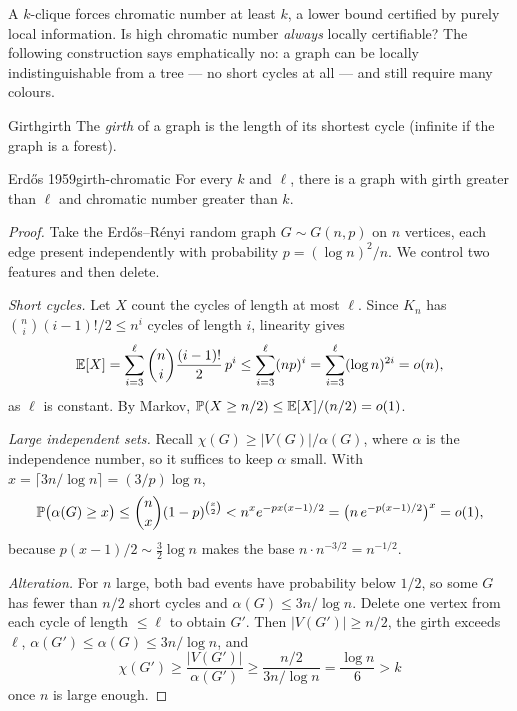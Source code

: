 A $k$-clique forces chromatic number at least $k$, a lower bound certified by
purely local information. Is high chromatic number \emph{always} locally
certifiable? The following construction says emphatically no: a graph can be
locally indistinguishable from a tree --- no short cycles at all --- and still
require many colours.

\begin{definition}{Girth}{girth}
The \emph{girth} of a graph is the length of its shortest cycle (infinite if the
graph is a forest).
\end{definition}

\begin{theorem}{Erd\H{o}s 1959}{girth-chromatic}
For every $k$ and $\ell$, there is a graph with girth greater than $\ell$ and
chromatic number greater than $k$.
\end{theorem}

\begin{proof}
Take the Erd\H{o}s--R\'enyi random graph $G\sim G(n,p)$ on $n$ vertices, each
edge present independently with probability $p=(\log n)^2/n$. We control two
features and then delete.

\smallskip\noindent\emph{Short cycles.} Let $X$ count the cycles of length at
most $\ell$. Since $K_n$ has $\binom ni(i-1)!/2\le n^i$ cycles of length $i$,
linearity gives
\[
  \mathbb{E}[X]=\sum_{i=3}^{\ell}\binom ni\frac{(i-1)!}{2}\,p^i
  \le\sum_{i=3}^{\ell}(np)^i
  =\sum_{i=3}^{\ell}(\log n)^{2i}=o(n),
\]
as $\ell$ is constant. By Markov, $\mathbb{P}(X\ge n/2)\le \mathbb{E}[X]/(n/2)=o(1)$.

\smallskip\noindent\emph{Large independent sets.} Recall
$\chi(G)\ge |V(G)|/\alpha(G)$, where $\alpha$ is the independence number, so it
suffices to keep $\alpha$ small. With $x=\lceil 3n/\log n\rceil=(3/p)\log n$,
\[
  \mathbb{P}\bigl(\alpha(G)\ge x\bigr)\le\binom nx(1-p)^{\binom x2}
  < n^x e^{-p x(x-1)/2}
  = \bigl(n\,e^{-p(x-1)/2}\bigr)^x = o(1),
\]
because $p(x-1)/2\sim\tfrac32\log n$ makes the base $n\cdot n^{-3/2}=n^{-1/2}$.

\smallskip\noindent\emph{Alteration.} For $n$ large, both bad events have
probability below $1/2$, so some $G$ has fewer than $n/2$ short cycles and
$\alpha(G)\le 3n/\log n$. Delete one vertex from each cycle of length
$\le\ell$ to obtain $G'$. Then $|V(G')|\ge n/2$, the girth exceeds $\ell$,
$\alpha(G')\le\alpha(G)\le 3n/\log n$, and
\[
  \chi(G')\ge\frac{|V(G')|}{\alpha(G')}\ge\frac{n/2}{3n/\log n}
  =\frac{\log n}{6}>k
\]
once $n$ is large enough.
\end{proof}

